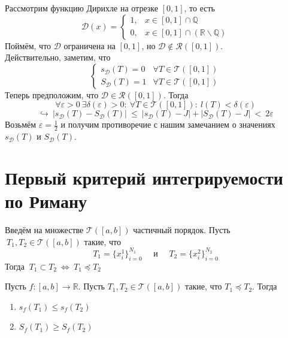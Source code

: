 \documentclass[11pt]{article}
\begin{document}
\begin{example}
    Рассмотрим функцию Дирихле на отрезке $[0, 1]$, то есть
    \[\mathcal{D}(x) = 
    \begin{cases}
        1, & x \in [0, 1] \cap \mathbb{Q} \\
        0, & x \in [0, 1] \cap (\mathbb{R} \backslash \mathbb{Q})
    \end{cases}\]
    Поймём, что $\mathcal{D}$ ограничена на $[0, 1]$, но $\mathcal{D} \notin \mathcal{R}([0, 1])$. \\
    Действительно, заметим, что 
    \[\begin{cases}
        s_{\mathcal{D}}(T) = 0 & \forall T \in \mathcal{T}([0, 1]) \\
        S_{\mathcal{D}}(T) = 1 & \forall T \in \mathcal{T}([0, 1])
    \end{cases}\]
    Теперь предположим, что $\mathcal{D} \in \mathcal{R}([0, 1])$. Тогда 
    \[\forall \varepsilon > 0 \ \exists \delta(\varepsilon) > 0 : \ \forall T \in 
    \mathcal{T}([0, 1]): \ l(T) < \delta(\varepsilon)\] 
    \[\hookrightarrow \ \left\lvert s_{\mathcal{D}}(T) - S_{\mathcal{D}}(T) \right\rvert \ \leq \ 
    \left\lvert s_{\mathcal{D}}(T) - J \right\rvert + \left\lvert S_{\mathcal{D}}(T) - J \right\rvert 
    \ < \ 2 \varepsilon\]
    Возьмём $\varepsilon = \displaystyle \frac{1}{2}$ и получим противоречие с нашим замечанием 
    о значениях $s_{\mathcal{D}}(T)$ и $S_{\mathcal{D}}(T)$.
\end{example}

\section{Первый критерий интегрируемости по Риману}

\begin{definition}
    Введём на множестве $\mathcal{T}([a, b])$ частичный порядок.
    Пусть $\ T_1, T_2 \in \mathcal{T}([a, b])$ такие, что 
    \[T_1 = \{x_i^1\}^{N_1}_{i = 0}
    \quad \text{ и } \quad T_2 = \{x_i^2\}^{N_2}_{i = 0}\]
    Тогда $\ T_1 \subset T_2 \ \Longleftrightarrow \ T_1 \preceq T_2$
\end{definition}

\begin{lemma}
    Пусть $f \colon [a, b] \to \mathbb{R}$. Пусть $T_1, T_2 \in 
    \mathcal{T}([a, b])$ такие, что $T_1 \preceq T_2$. Тогда 
    \begin{enumerate}
        \item $s_f(T_1) \leq s_f(T_2)$
        \item $S_f(T_1) \geq S_f(T_2)$
    \end{enumerate}
\end{lemma}
\end{document}
